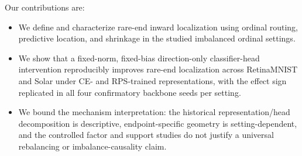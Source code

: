 Our contributions are:
\begin{itemize}
    \item We define and characterize rare-end inward localization using
    ordinal routing, predictive location, and shrinkage in the studied
    imbalanced ordinal settings.
    \item We show that a fixed-norm, fixed-bias direction-only classifier-head
    intervention reproducibly improves rare-end localization across
    RetinaMNIST and Solar under CE- and RPS-trained representations, with the
    effect sign replicated in all four confirmatory backbone seeds per setting.
    \item We bound the mechanism interpretation: the historical
    representation/head decomposition is descriptive, endpoint-specific
    geometry is setting-dependent, and the controlled factor and support
    studies do not justify a universal rebalancing or imbalance-causality
    claim.
\end{itemize}
